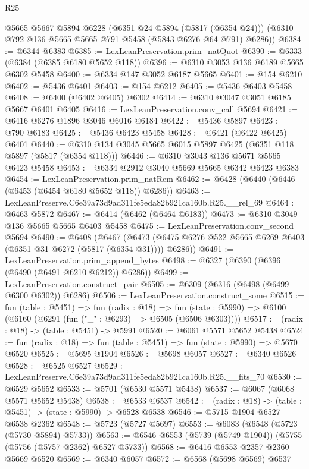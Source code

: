 \begin{lexlean}{R25}
\begin{coremodule}
      @5665
      @5667
      @5894
      @6228
      (@6351 @24 @5894 (@5817 (@6354 @24)))
      (@6310 @792 @136 @5665 @5665 @791 @5458 (@5843 @6276 @64 @791) @6286))
@6384 := @6344 @6383
@6385 := LexLeanPreservation.prim_natQuot
@6390 := @6333 (@6384 (@6385 @6180 @5652 @118))
@6396 := @6310 @3053 @136 @6189 @5665 @6302 @5458
@6400 := @6334 @147 @3052 @6187 @5665
@6401 := @154 @6210
@6402 := @5436 @6401
@6403 := @154 @6212
@6405 := @5436 @6403 @5458
@6408 := @6400 (@6402 @6405) @6302
@6414 := @6310 @3047 @3051 @6185 @5667 @6401 @6405
@6416 := LexLeanPreservation.conv_call @5694
@6421 := @6416 @6276 @1896 @3046 @6016 @6184
@6422 := @5436 @5897
@6423 := @790 @6183
@6425 := @5436 @6423 @5458
@6428 := @6421 (@6422 @6425) @6401
@6440 := @6310 @134 @3045 @5665 @6015 @5897 @6425 (@6351 @118 @5897 (@5817 (@6354 @118)))
@6446 := @6310 @3043 @136 @5671 @5665 @6423 @5458
@6453 := @6334 @2912 @3040 @5669 @5665 @6342 @6423 @6383
@6454 := LexLeanPreservation.prim_natRem
@6462 := @6428 (@6440 (@6446 (@6453 (@6454 @6180 @5652 @118)) @6286))
@6463 := LexLeanPreserve.C6e39a73d9ad311fe5eda82b921ca160b.R25.__rel_69
@6464 := @6463 @5872
@6467 := @6414 (@6462 (@6464 @6183))
@6473 := @6310 @3049 @136 @5665 @5665 @6403 @5458
@6475 := LexLeanPreservation.conv_second @5694
@6490 := @6408
    (@6467 (@6473 (@6475 @6276 @522 @5665 @6269 @6403 (@6351 @31 @6272 (@5817 (@6354 @31)))) @6286))
@6491 := LexLeanPreservation.prim_append_bytes
@6498 := @6327 (@6390 (@6396 (@6490 (@6491 @6210 @6212)) @6286))
@6499 := LexLeanPreservation.construct_pair
@6505 := @6309 (@6316 (@6498 (@6499 @6300 @6302)) @6286)
@6506 := LexLeanPreservation.construct_some
@6515 := fun (table : @5451) =>
  fun (radix : @18) =>
  fun (state : @5990) => @6100 (@6160 (@6291 (fun ("_" : @6293) => @6505 (@6506 @6303))))
@6517 := (radix : @18) -> (table : @5451) -> @5991
@6520 := @6061 @5571 @5652 @5438
@6524 := fun (radix : @18) => fun (table : @5451) => fun (state : @5990) => @5670 @6520
@6525 := @5695 @1904
@6526 := @5698 @6057
@6527 := @6340 @6526
@6528 := @6525 @6527
@6529 := LexLeanPreserve.C6e39a73d9ad311fe5eda82b921ca160b.R25.__fits_70
@6530 := @6529 @5652
@6533 := @5701 (@6530 @5571 @5438)
@6537 := @6067 (@6068 @5571 @5652 @5438)
@6538 := @6533 @6537
@6542 := (radix : @18) -> (table : @5451) -> (state : @5990) -> @6528 @6538
@6546 := @5715 @1904 @6527 @6538 @2362
@6548 := @5723 (@5727 @5697)
@6553 := @6083 (@6548 (@5723 (@5730 @5894) @5733))
@6563 := @6546 @6553 (@5739 (@5749 @1904)) (@5755 (@5756 (@5757 @2362) @6527 @5733))
@6568 := @6416 @6553 @2357 @2360 @5669 @6520
@6569 := @6340 @6057
@6572 := @6568 (@5698 @6569) @6537

\end{coremodule}
\end{lexlean}
